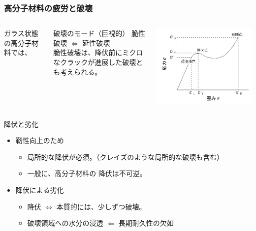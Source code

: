 \documentclass[11pt, dvipdfmx]{beamer}
\begin{document}
\begin{frame}
\frametitle{高分子材料の疲労と破壊}
\begin{columns}[totalwidth=1\textwidth]
ガラス状態の高分子材料では、
\begin{block}{破壊のモード（巨視的）}
脆性破壊 $\Leftrightarrow$ 延性破壊\\
脆性破壊は、降伏前にミクロなクラックが進展した破壊とも考えられる。
\end{block}
	\centering
	\includegraphics[width=\textwidth]{./fig/S_S_Curve.png}
\end{columns}
\begin{exampleblock}{降伏と劣化}
	\begin{itemize}
	\item
	靭性向上のため
	\begin{itemize}
		\item
		{\color{red} 局所的な降伏}が必須。（クレイズのような局所的な破壊も含む）
		\item 
		一般に、高分子材料の{\color{red} 降伏は不可逆}。
	\end{itemize}
	\item
	降伏による劣化
		\begin{itemize}
			\item 
			降伏 $\Leftrightarrow$ {\color{red} 本質的には、少しずつ破壊。}
			\item
			{\color{red} 破壊領域への水分の浸透 $\Leftarrow$ 長期耐久性の欠如}
		\end{itemize}
	\end{itemize}
\end{exampleblock}
\end{frame}
\end{document}
